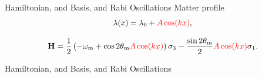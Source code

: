 \documentclass[9pt]{beamer}
\begin{document}
\begin{darkframes}
\begin{frame}{Hamiltonian, and Basis, and Rabi Oscillations}
Matter profile
\begin{equation*}
    \lambda(x) = \lambda_0 + {\color{red}A \cos (k x)},
\end{equation*}


\begin{equation*}
    \mathbf {H} = \frac{1}{2}\left( - \omega_{\mathrm{m}} +  \cos 2\theta_{\mathrm{m}}{\color{red}A\cos(kx)} \right) \sigma_3 - \frac{  \sin 2\theta_{\mathrm{m} }  }{2}{\color{red}A \cos(kx)}  \sigma_1.
\end{equation*}





\end{frame}




\begin{frame}{Hamiltonian, and Basis, and Rabi Oscillations}





\end{frame}
\end{darkframes}
\end{document}
